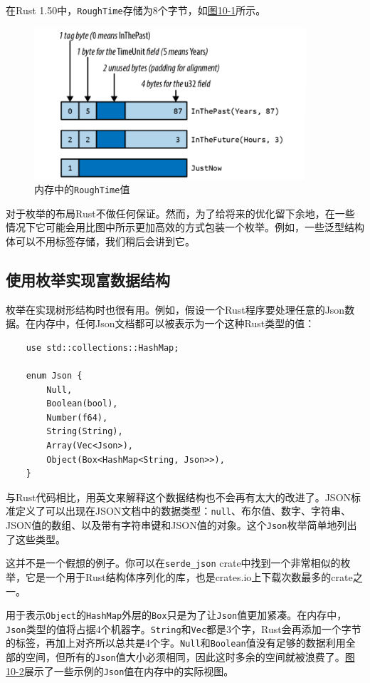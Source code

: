 在Rust 1.50中，\texttt{RoughTime}存储为8个字节，如\hyperref[f10-1]{图10-1}所示。

\begin{figure}[htbp]
    \centering
    \includegraphics[width=0.9\textwidth]{../img/f10-1.png}
    \caption{内存中的\texttt{RoughTime}值}
    \label{f10-1}
\end{figure}

对于枚举的布局Rust不做任何保证。然而，为了给将来的优化留下余地，在一些情况下它可能会用比图中所示更加高效的方式包装一个枚举。例如，一些泛型结构体可以不用标签存储，我们稍后会讲到它。

\subsection{使用枚举实现富数据结构}

枚举在实现树形结构时也很有用。例如，假设一个Rust程序要处理任意的Json数据。在内存中，任何Json文档都可以被表示为一个这种Rust类型的值：
\begin{verbatim}
    use std::collections::HashMap;

    enum Json {
        Null,
        Boolean(bool),
        Number(f64),
        String(String),
        Array(Vec<Json>),
        Object(Box<HashMap<String, Json>>),
    }
\end{verbatim}

与Rust代码相比，用英文来解释这个数据结构也不会再有太大的改进了。JSON标准定义了可以出现在JSON文档中的数据类型：\texttt{null}、布尔值、数字、字符串、JSON值的数组、以及带有字符串键和JSON值的对象。这个\texttt{Json}枚举简单地列出了这些类型。

这并不是一个假想的例子。你可以在\texttt{serde\_json} crate中找到一个非常相似的枚举，它是一个用于Rust结构体序列化的库，也是crates.io上下载次数最多的crate之一。

用于表示\texttt{Object}的\texttt{HashMap}外层的\texttt{Box}只是为了让\texttt{Json}值更加紧凑。在内存中，\texttt{Json}类型的值将占据4个机器字。\texttt{String}和\texttt{Vec}都是3个字，Rust会再添加一个字节的标签，再加上对齐所以总共是4个字。\texttt{Null}和\texttt{Boolean}值没有足够的数据利用全部的空间，但所有的\texttt{Json}值大小必须相同，因此这时多余的空间就被浪费了。\hyperref[f10-2]{图10-2}展示了一些示例的\texttt{Json}值在内存中的实际视图。

